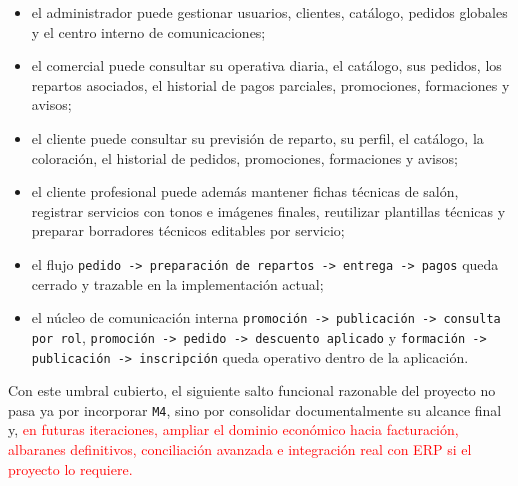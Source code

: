\begin{itemize}
    \item el administrador puede gestionar usuarios, clientes, catálogo, pedidos globales y el centro interno de comunicaciones;
    \item el comercial puede consultar su operativa diaria, el catálogo, sus pedidos, los repartos asociados, el historial de pagos parciales, promociones, formaciones y avisos;
    \item el cliente puede consultar su previsión de reparto, su perfil, el catálogo, la coloración, el historial de pedidos, promociones, formaciones y avisos;
    \item el cliente profesional puede además mantener fichas técnicas de salón, registrar servicios con tonos e imágenes finales, reutilizar plantillas técnicas y preparar borradores técnicos editables por servicio;
    \item el flujo \texttt{pedido -> preparación de repartos -> entrega -> pagos} queda cerrado y trazable en la implementación actual;
    \item el núcleo de comunicación interna \texttt{promoción -> publicación -> consulta por rol}, \texttt{promoción -> pedido -> descuento aplicado} y \texttt{formación -> publicación -> inscripción} queda operativo dentro de la aplicación.
\end{itemize}

Con este umbral cubierto, el siguiente salto funcional razonable del proyecto no pasa ya por incorporar \texttt{M4}, sino por consolidar documentalmente su alcance final y, \textcolor{red}{en futuras iteraciones, ampliar el dominio económico hacia facturación, albaranes definitivos, conciliación avanzada e integración real con ERP si el proyecto lo requiere.}

